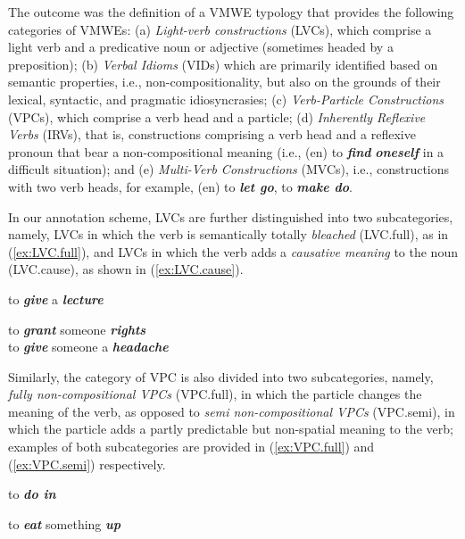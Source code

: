 \documentclass[output=paper,colorlinks,citecolor=brown]{langscibook}
\begin{document}
The outcome was the definition of a VMWE typology that provides the following categories of VMWEs: (a) \textit{Light-verb constructions} (LVCs), which comprise a light verb and a predicative noun or adjective (sometimes headed by a preposition); (b) \textit{Verbal Idioms} (VIDs) which are primarily identified based on semantic properties, i.e., non-compositionality, but also on the grounds of their lexical, syntactic, and pragmatic idiosyncrasies; (c) \textit{Verb-Particle Constructions} (VPCs), which comprise a verb head and a particle; (d) \textit{Inherently Reflexive Verbs} (IRVs), that is, constructions comprising a verb head and a reflexive pronoun that bear a non-compositional meaning (i.e., (en) to \textbf{\em{find}} \textbf{\em{oneself}} in a difficult situation); and (e) \textit{Multi-Verb Constructions} (MVCs), i.e., constructions with two verb heads, for example, (en) to \textbf{\em{let go}}, to \textbf{\em{make do}}.

In our annotation scheme, LVCs are further distinguished into two subcategories, namely, LVCs in which the verb is semantically totally \textit{bleached} (LVC.full), as in (\ref{ex:LVC.full}), and LVCs in which the verb adds a \textit{causative meaning} to the noun (LVC.cause), as shown in (\ref{ex:LVC.cause}).

\ea
\label{ex:LVC.full}
\settowidth {}
to \textbf{\em{give}} a \textbf{\em{lecture}}\\
\z

\ea
\label{ex:LVC.cause}
\settowidth {}
to \textbf{\em{grant}} someone \textbf{\em{rights}}\\
to \textbf{\em{give}} someone a \textbf{\em{headache}}\\
\z

Similarly, the category of VPC is also divided into two subcategories, namely, \textit{fully non-compositional VPCs} (VPC.full), in which the particle changes the meaning of the verb, as opposed to \textit{semi non-compositional VPCs} (VPC.semi), in which the particle adds a partly predictable but non-spatial meaning to the verb; examples of both subcategories are provided in (\ref{ex:VPC.full}) and (\ref{ex:VPC.semi}) respectively.

\ea
\label{ex:VPC.full}
\settowidth {}
to \textbf{\em{do in}}\\
\z

\ea
\label{ex:VPC.semi}
\settowidth {}
to \textbf{\em{eat}} something \textbf{\em{up}}\\
\z
\end{document}
